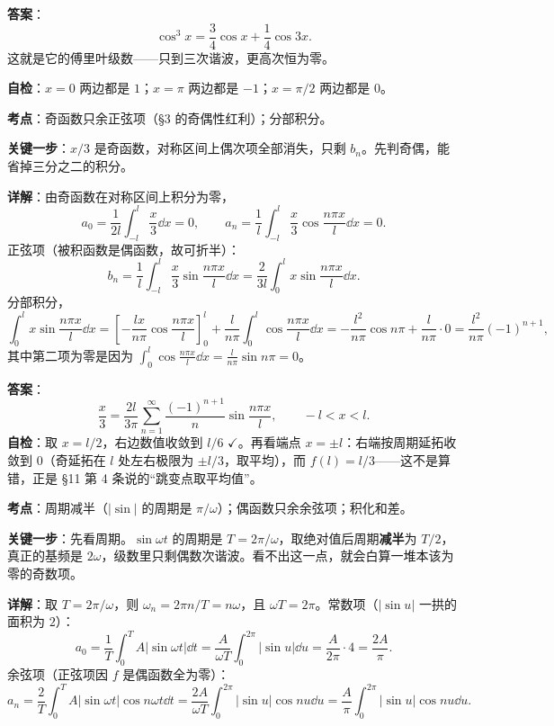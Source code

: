 \documentclass[11pt]{ctexart}
\begin{document}
\textbf{答案}：
\[ \cos^3x=\frac34\cos x+\frac14\cos3x .\]
这就是它的傅里叶级数——只到三次谐波，更高次恒为零。

\textbf{自检}：$x=0$ 两边都是 $1$；$x=\pi$ 两边都是 $-1$；$x=\pi/2$ 两边都是 $0$。

\qbreak



\textbf{考点}：奇函数只余正弦项（§3 的奇偶性红利）；分部积分。

\textbf{关键一步}：$x/3$ 是奇函数，对称区间上偶次项全部消失，只剩 $b_n$。先判奇偶，能省掉三分之二的积分。

\textbf{详解}：由奇函数在对称区间上积分为零，
\[ a_0=\frac{1}{2l}\int_{-l}^{l}\frac{x}{3}\dd x=0,\qquad a_n=\frac1l\int_{-l}^{l}\frac{x}{3}\cos\frac{n\pi x}{l}\dd x=0 .\]
正弦项（被积函数是偶函数，故可折半）：
\[ b_n=\frac1l\int_{-l}^{l}\frac{x}{3}\sin\frac{n\pi x}{l}\dd x=\frac{2}{3l}\int_0^{l}x\sin\frac{n\pi x}{l}\dd x .\]
分部积分，
\[
\int_0^{l}x\sin\frac{n\pi x}{l}\dd x
=\left[-\frac{lx}{n\pi}\cos\frac{n\pi x}{l}\right]_0^{l}+\frac{l}{n\pi}\int_0^{l}\cos\frac{n\pi x}{l}\dd x
=-\frac{l^2}{n\pi}\cos n\pi+\frac{l}{n\pi}\cdot 0=\frac{l^2}{n\pi}(-1)^{n+1},
\]
其中第二项为零是因为 $\int_0^{l}\cos\frac{n\pi x}{l}\dd x=\frac{l}{n\pi}\sin n\pi=0$。

\textbf{答案}：
\[ \frac{x}{3}=\frac{2l}{3\pi}\sum_{n=1}^{\infty}\frac{(-1)^{n+1}}{n}\sin\frac{n\pi x}{l},\qquad -l<x<l .\]
\textbf{自检}：取 $x=l/2$，右边数值收敛到 $l/6$ $\checkmark$。再看端点 $x=\pm l$：右端按周期延拓收敛到 $0$（奇延拓在 $l$ 处左右极限为 $\pm l/3$，取平均），而 $f(l)=l/3$——这不是算错，正是 §11 第 4 条说的“跳变点取平均值”。

\qbreak



\textbf{考点}：周期减半（$|\sin|$ 的周期是 $\pi/\omega$）；偶函数只余余弦项；积化和差。

\textbf{关键一步}：先看周期。$\sin\omega t$ 的周期是 $T=2\pi/\omega$，取绝对值后周期\textbf{减半}为 $T/2$，真正的基频是 $2\omega$，级数里只剩偶数次谐波。看不出这一点，就会白算一堆本该为零的奇数项。

\textbf{详解}：取 $T=2\pi/\omega$，则 $\omega_n=2\pi n/T=n\omega$，且 $\omega T=2\pi$。常数项（$|\sin u|$ 一拱的面积为 $2$）：
\[ a_0=\frac1T\int_0^{T}A|\sin\omega t|\dd t=\frac{A}{\omega T}\int_0^{2\pi}|\sin u|\dd u=\frac{A}{2\pi}\cdot4=\frac{2A}{\pi} .\]
余弦项（正弦项因 $f$ 是偶函数全为零）：
\[ a_n=\frac{2}{T}\int_0^{T}A|\sin\omega t|\cos n\omega t\dd t=\frac{2A}{\omega T}\int_0^{2\pi}|\sin u|\cos nu\dd u=\frac{A}{\pi}\int_0^{2\pi}|\sin u|\cos nu\dd u .\]
\end{document}
